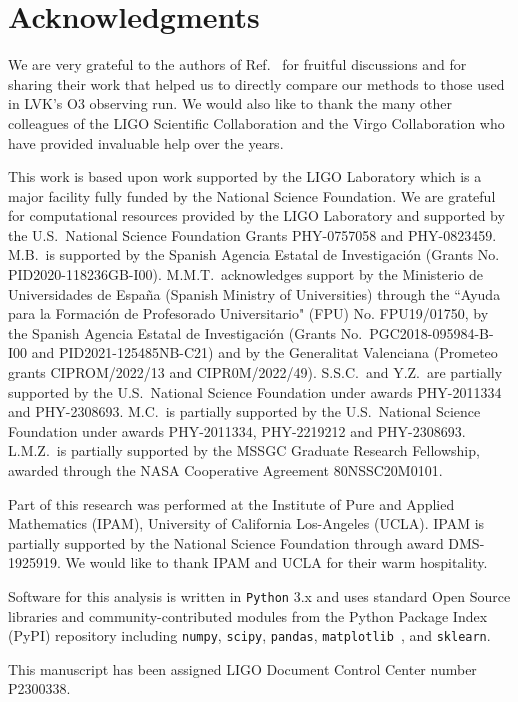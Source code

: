 \section*{Acknowledgments}

We are very grateful to the authors of Ref.~\cite{Chatterjee:2019avs} for fruitful discussions and for sharing their work that helped us to directly compare
our methods to those used in \ac{LVK}'s \ac{O3} observing run. We would also like to thank the many other colleagues of the LIGO Scientific Collaboration and
the Virgo Collaboration who have provided invaluable help over the years.

This work is based upon work supported by the LIGO Laboratory which is a major facility fully funded by the National Science Foundation. We are grateful for computational resources provided
by the LIGO Laboratory and supported by the U.S.\ National Science Foundation Grants PHY-0757058 and PHY-0823459. M.B.\ is supported by the Spanish Agencia Estatal de Investigaci\'on (Grants
No. PID2020-118236GB-I00). M.M.T.\ acknowledges support by the Ministerio de Universidades de Espa\~na (Spanish Ministry of Universities) through the ``Ayuda para la Formaci\'on de
Profesorado Universitario" (FPU) No. FPU19/01750, by the Spanish Agencia Estatal de Investigaci\'on (Grants No.\ PGC2018-095984-B-I00 and PID2021-125485NB-C21) and by the Generalitat
Valenciana (Prometeo grants CIPROM/2022/13 and CIPR0M/2022/49). S.S.C.\ and Y.Z.\ are partially supported by the U.S.\ National Science Foundation under awards PHY-2011334 and PHY-2308693.
M.C.\ is partially supported by the U.S.\ National Science Foundation under awards PHY-2011334, PHY-2219212 and PHY-2308693. L.M.Z.\ is partially supported by the MSSGC Graduate Research
Fellowship, awarded through the NASA Cooperative Agreement 80NSSC20M0101.

 Part of this research was performed at the Institute of Pure and Applied Mathematics (IPAM),  University of California Los-Angeles (UCLA). IPAM is partially supported by the National Science
Foundation through award DMS-1925919. We would like to thank IPAM and UCLA for their warm hospitality. 

Software for this analysis is written in \texttt{Python} 3.x  and uses standard Open Source libraries and community-contributed modules from the Python Package Index (PyPI) repository  including \texttt{numpy}, \texttt{scipy}, \texttt{pandas}, \texttt{matplotlib}~\cite{Hunter:2007ouj}, and \texttt{sklearn}.

This manuscript has been assigned LIGO Document Control Center number P2300338.





